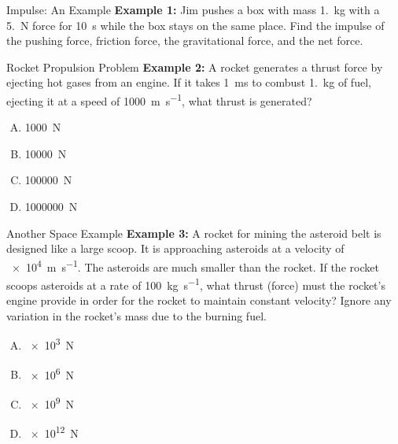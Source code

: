 \documentclass[12pt,compress,aspectratio=169]{beamer}
\begin{document}
\begin{frame}{Impulse: An Example}
  \textbf{Example 1:} Jim pushes a box with mass \SI{1.}{\kilo\gram} with a
  \SI{5.}{\newton} force for \SI{10}{\second} while the box stays on the same
  place. Find the impulse of the pushing force, friction force, the
  gravitational force, and the net force.
\end{frame}



\begin{frame}{Rocket Propulsion Problem}
  \textbf{Example 2:} A rocket generates a thrust force by ejecting hot gases
  from an engine. If it takes \SI{1}{\milli\second} to combust
  \SI{1.}{\kilo\gram} of fuel, ejecting it at a speed of
  \SI{1000}{\metre\per\second}, what thrust is generated?
  
  \vspace{.15in}\begin{enumerate}[A.]
  \item \SI{1000}{\newton}
  \item \SI{10000}{\newton}
  \item \SI{100000}{\newton}
  \item \SI{1000000}{\newton}
  \end{enumerate}
\end{frame}



\begin{frame}{Another Space Example}
  \textbf{Example 3:} A rocket for mining the asteroid belt is designed like a
  large scoop. It is approaching asteroids at a velocity of
  \SI{e4}{\metre\per\second}. The asteroids are much smaller than the rocket.
  If the rocket scoops asteroids at a rate of \SI{100}{\kilo\gram\per\second},
  what thrust (force) must the rocket's engine provide in order for the rocket
  to maintain constant velocity? Ignore any variation in the rocket's mass due
  to the burning fuel.

  \vspace{.15in}\begin{enumerate}[A.]
  \item\SI{e3}{\newton}
  \item\SI{e6}{\newton}
  \item\SI{e9}{\newton}
  \item\SI{e12}{\newton}
  \end{enumerate}
\end{frame}
\end{document}
